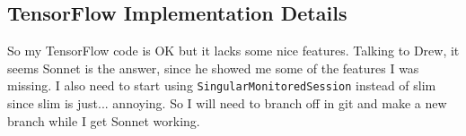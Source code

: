 \documentclass[a4paper]{article}
\begin{document}
\subsection*{TensorFlow Implementation Details}
So my TensorFlow code is OK but it lacks some nice features.
Talking to Drew, it seems Sonnet is the answer, since he showed me some of the features I was missing.
I also need to start using \texttt{SingularMonitoredSession} instead of slim since slim is just... annoying.
So I will need to branch off in git and make a new branch while I get Sonnet working.
\end{document}
